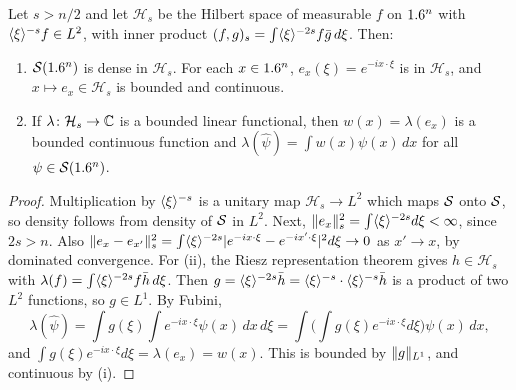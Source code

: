 \begin{lemma}\label{distributions:lem:representation}
Let $s>n/2$ and let $\mathcal{H}_s$ be the Hilbert space of measurable $f$ on $1.6^n$
with $\langle \xi\rangle^{-s}f\in L^2$, with inner product
$(f,g)_s=\int\langle \xi\rangle^{-2s}f\bar g\,d\xi$. Then:
\begin{enumerate}[label=(\roman*)]
\item $\mathcal{S}(1.6^n)$ is dense in $\mathcal{H}_s$. For each $x\in1.6^n$,
  $e_x(\xi)=e^{-ix\cdot\xi}$ is in $\mathcal{H}_s$, and $x\mapsto e_x\in\mathcal{H}_s$ is
  bounded and continuous.
\item If $\lambda\colon\mathcal{H}_s\to\mathbb{C}$ is a bounded linear functional, then
  $w(x)=\lambda(e_x)$ is a bounded continuous function and
  $\lambda(\hat\psi)=\int w(x)\psi(x)\,dx$ for all $\psi\in\mathcal{S}(1.6^n)$.
\end{enumerate}
\end{lemma}
\begin{proof}
Multiplication by $\langle \xi\rangle^{-s}$ is a unitary map $\mathcal{H}_s\to L^2$ which maps
$\mathcal{S}$ onto $\mathcal{S}$, so density follows from density of $\mathcal{S}$ in $L^2$. Next,
$\lVert e_x\rVert_s^2=\int\langle \xi\rangle^{-2s}d\xi<\infty$, since $2s>n$. Also
$\lVert e_x-e_{x'}\rVert_s^2=\int\langle \xi\rangle^{-2s}|e^{-ix\cdot\xi}-e^{-ix'\cdot\xi}|^2d\xi\to0$
as $x'\to x$, by dominated convergence. For (ii), the Riesz representation theorem gives
$h\in\mathcal{H}_s$ with $\lambda(f)=\int\langle \xi\rangle^{-2s}f\bar h\,d\xi$. Then
$g=\langle \xi\rangle^{-2s}\bar h=\langle \xi\rangle^{-s}\cdot\langle \xi\rangle^{-s}\bar h$ is a product of two
$L^2$ functions, so $g\in L^1$. By Fubini,
\[
  \lambda(\hat\psi)=\int g(\xi)\int e^{-ix\cdot\xi}\psi(x)\,dx\,d\xi
  =\int\Big(\int g(\xi)e^{-ix\cdot\xi}d\xi\Big)\psi(x)\,dx,
\]
and $\int g(\xi)e^{-ix\cdot\xi}d\xi=\lambda(e_x)=w(x)$. This is bounded by $\lVert g\rVert_{L^1}$,
and continuous by (i).
\end{proof}

